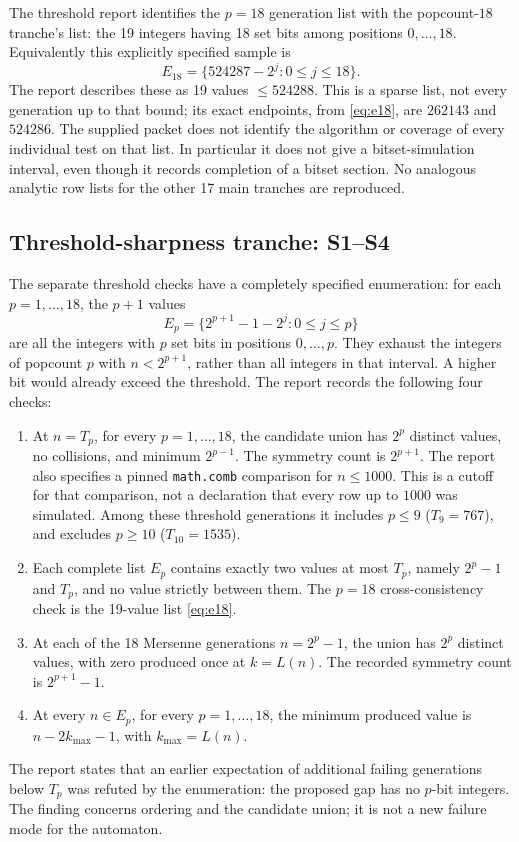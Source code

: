 \documentclass[11pt]{article}
\begin{document}
The threshold report identifies the $p=18$ generation list with the
popcount-$18$ tranche's list: the 19 integers having 18 set bits among
positions $0,\ldots,18$. Equivalently this explicitly specified sample is
\begin{equation}
 E_{18}=\{524287-2^j:0\leq j\leq18\}.
 \label{eq:e18}
\end{equation}
The report describes these as 19 values $\leq524288$. This is a sparse
list, not every generation up to that bound; its exact endpoints, from
\eqref{eq:e18}, are $262143$ and $524286$. The supplied packet does not
identify the algorithm or coverage of every individual test on that list.
In particular it does not give a bitset-simulation interval, even though
it records completion of a bitset section. No analogous analytic row
lists for the other 17 main tranches are reproduced.

\subsection{Threshold-sharpness tranche: S1--S4}

The separate threshold checks have a completely specified enumeration:
for each $p=1,\ldots,18$, the $p+1$ values
\begin{equation}
 E_p=\{2^{p+1}-1-2^j:0\leq j\leq p\}
 \label{eq:ep}
\end{equation}
are all the integers with $p$ set bits in positions $0,\ldots,p$. They
exhaust the integers of popcount $p$ with $n<2^{p+1}$, rather than all
integers in that interval. A higher bit would already exceed the threshold.
The report records the following four checks:
\begin{enumerate}
\item[\textbf{S1.}] At $n=T_p$, for every $p=1,\ldots,18$, the candidate
union has $2^p$ distinct values, no collisions, and minimum $2^{p-1}$.
The symmetry count is $2^{p+1}$. The report also specifies a pinned
\texttt{math.comb} comparison for $n\leq1000$. This is a cutoff for that
comparison, not a declaration that every row up to $1000$ was simulated.
Among these threshold generations it includes $p\leq9$ ($T_9=767$),
and excludes $p\geq10$ ($T_{10}=1535$).
\item[\textbf{S2.}] Each complete list $E_p$ contains exactly two values
at most $T_p$, namely $2^p-1$ and $T_p$, and no value strictly between
them. The $p=18$ cross-consistency check is the 19-value list
\eqref{eq:e18}.
\item[\textbf{S3.}] At each of the 18 Mersenne generations $n=2^p-1$,
the union has $2^p$ distinct values, with zero produced once at $k=L(n)$.
The recorded symmetry count is $2^{p+1}-1$.
\item[\textbf{S4.}] At every $n\in E_p$, for every $p=1,\ldots,18$,
the minimum produced value is $n-2k_{\max}-1$, with $k_{\max}=L(n)$.
\end{enumerate}
The report states that an earlier expectation of additional failing
generations below $T_p$ was refuted by the enumeration: the proposed gap
has no $p$-bit integers. The finding concerns ordering and the candidate
union; it is not a new failure mode for the automaton.
\end{document}
